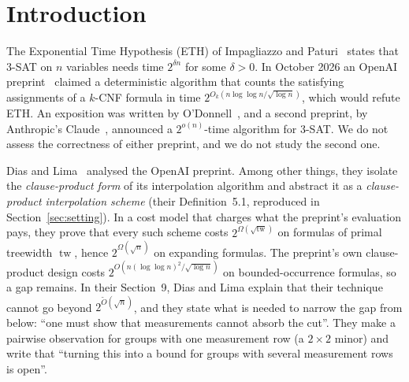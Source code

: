 \documentclass[11pt,a4paper]{article}
\theoremstyle{definition}
\theoremstyle{remark}
\newcommand{\tw}{\operatorname{tw}}
\begin{document}
\section{Introduction}\label{sec:intro}

The Exponential Time Hypothesis (ETH) of Impagliazzo and Paturi~\cite{IP01} states that 3-SAT
on $n$ variables needs time $2^{\delta n}$ for some $\delta>0$. In October 2026 an OpenAI
preprint~\cite{OpenAI} claimed a deterministic algorithm that counts the satisfying assignments
of a $k$-CNF formula in time $2^{O_k(n\log\log n/\sqrt{\log n})}$, which would refute ETH. An
exposition was written by O'Donnell~\cite{ODonnell}, and a second preprint, by Anthropic's
Claude~\cite{Claude}, announced a $2^{o(n)}$-time algorithm for 3-SAT. We do not assess the
correctness of either preprint, and we do not study the second one.

Dias and Lima~\cite{DL} analysed the OpenAI preprint. Among other things, they isolate the
\emph{clause-product form} of its interpolation algorithm and abstract it as a
\emph{clause-product interpolation scheme} (their Definition~5.1, reproduced in
Section~\ref{sec:setting}). In a cost model that charges what the preprint's evaluation pays,
they prove that every such scheme costs $2^{\Omega(\sqrt{\tw})}$ on formulas of primal
treewidth $\tw$, hence $2^{\Omega(\sqrt n)}$ on expanding formulas. The preprint's own
clause-product design costs $2^{O(n(\log\log n)^2/\sqrt{\log n})}$ on bounded-occurrence
formulas, so a gap remains. In their Section~9, Dias and Lima explain that their technique
cannot go beyond $2^{\tilde O(\sqrt n)}$, and they state what is needed to narrow the gap from
below: ``one must show that measurements cannot absorb the cut''. They make a pairwise
observation for groups with one measurement row (a $2\times2$ minor) and write that ``turning
this into a bound for groups with several measurement rows is open''.
\end{document}
